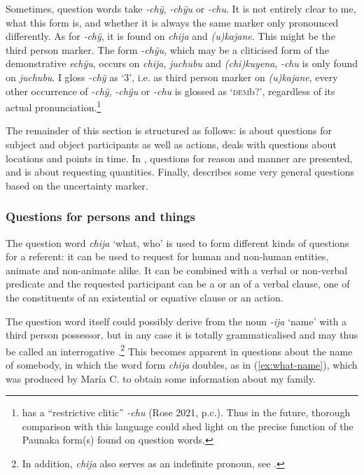 Sometimes, question words take \textit{-chÿ}, \textit{-chÿu} or \textit{-chu}. It is not entirely clear to me, what this form is, and whether it is always the same marker only pronounced differently. As for \textit{-chÿ}, it is found on \textit{chija} and \textit{(u)kajane}. This might be the third person marker. The form \textit{-chÿu}, which may be a cliticised form of the demonstrative \textit{echÿu}, occurs on \textit{chija}, \textit{juchubu} and \textit{(chi)kuyena}, \textit{-chu} is only found on \textit{juchubu}. I gloss \textit{-chÿ} as ‘3’, i.e. as third person marker on \textit{(u)kajane}, every other occurrence of \textit{-chÿ}, \textit{-chÿu} or \textit{-chu} is glossed as ‘\textsc{dem}b?’, regardless of its actual pronunciation.\footnote{ has a “restrictive clitic” \textit{-chu} (Rose 2021, p.c.). Thus in the future, thorough comparison with this language could shed light on the precise function of the Paunaka form(s) found on question words.}

The remainder of this section is structured as follows:  is about questions for subject and object participants as well as actions,  deals with questions about locations and points in time. In , questions for reason and manner are presented, and  is about requesting quantities. Finally,  describes some very general questions based on the uncertainty marker. 

\subsubsection{Questions for persons and things}\label{sec:Q_chija}

The question word  \textit{chija} ‘what, who’ is used to form different kinds of questions for a referent: it can be used to request for human and non-human entities, animate and non-animate alike. It can be combined with a verbal or non-verbal predicate and the requested participant can be a  or an  of a verbal clause, one of the constituents of an existential or equative clause or an action.

The question word itself could possibly derive from the noun \textit{-ija} ‘name’ with a third person possessor, but in any case it is totally grammaticalised and may thus be called an interrogative .\footnote{In addition, \textit{chija} also serves as an indefinite pronoun, see .} This becomes apparent in questions about the name of somebody, in which the word form \textit{chija} doubles, as in (\ref{ex:what-name}), which was produced by María C. to obtain some information about my family.

